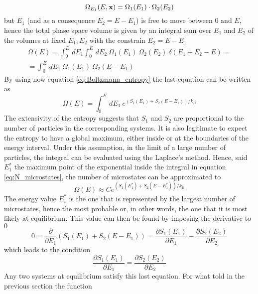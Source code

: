 \begin{equation*} 
    \Omega_{E_1}(E, \mathbf{x}) = \Omega_1(E_1) \cdot \Omega_2(E_2)
\end{equation*}
but $E_1$ (and as a consequence $E_2 = E - E_1$) is free to move between $0$ and $E$, hence the total phase space volume is given by an integral sum over $E_1$ and $E_2$ of the volumes at fixed $E_1, E_2$ with the constrain $E_2 = E - E_1$ \\
\begin{gather*}
    \Omega(E) = \int_0^E \, dE_1 \int_0^E \, dE_2 \ \Omega_1(E_1) \ \Omega_2(E_2) \ \delta(E_1 + E_2 - E) = \\
    = \int_0^E \, dE_1 \ \Omega_1(E_1) \ \Omega_2(E - E_1)
\end{gather*}
By using now equation \ref{eq:Boltzmann_entropy} the last equation can be written as 
\begin{equation}
    \Omega(E) = \int_0^E \, dE_1 \ e^{(S_1(E_1) + S_2(E-E_1))/k_B}
    \label{eq:N_microstates}
\end{equation}
The extensivity of the entropy suggests that $S_1$ and $S_2$ are proportional to the number of particles in the corresponding systems. It is also legitimate to expect the entropy 
to have a global maximum, either inside or at the boundaries of the energy interval. Under this assumption, in the limit of a large number of particles, the integral can be evaluated using the Laplace's method. Hence, said $E_1^*$ the maximum point of the exponential inside the integral in equation \ref{eq:N_microstates}, the number of microstates can be approximated to
\begin{equation*}
    \Omega(E) \approx C e^{(S_1(E_1^*) + S_2(E-E_1^*))/k_B}
\end{equation*}
The energy value $E_1^*$ is the one that is represented by the largest number of microstates, hence the most probable or, in other words, the one that it is most likely at equilibrium. This value can then be found by imposing the derivative to $0$
\begin{equation*}
    0 = \frac{\partial}{\partial E_1}(S_1(E_1) + S_2(E-E_1)) = \frac{\partial S_1(E_1)}{\partial E_1} - \frac{\partial S_2(E_2)}{\partial E_2} 
\end{equation*}
which leads to the condition
\begin{equation*}
    \frac{\partial S_1(E_1)}{\partial E_1} = \frac{\partial S_2(E_2)}{\partial E_2} 
\end{equation*}
Any two systems at equilibrium satisfy this last equation. For what told in the previous section the function 
